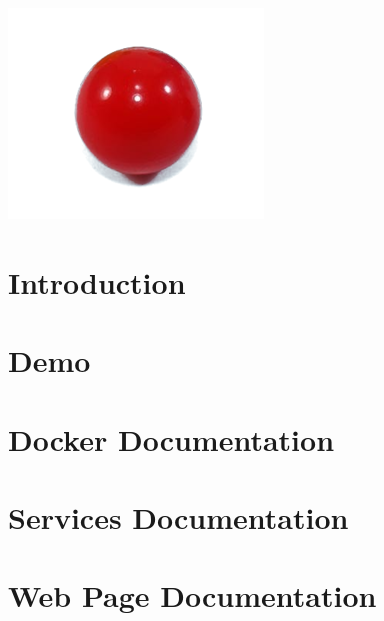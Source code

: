 \documentclass[11pt]{article}
\begin{document}
    \clearpage
    \maketitle
    \includegraphics[scale=1.5]{favicon}
    \thispagestyle{empty}

    \newpage
    \tableofcontents{}
    \thispagestyle{empty}

    \newpage
    \setcounter{page}{1}
    \section{Introduction}\label{sec:introduction}
    

    \newpage
    \section{Demo}\label{sec:Demo}
    

    \newpage
    \section{Docker Documentation}\label{sec:DockerDocumentation}
    

    \newpage
    \section{Services Documentation}\label{sec:ServicesDocumentation}
    

    \newpage
    \section{Web Page Documentation}\label{sec:Web Page Documentation}
    
\end{document}
